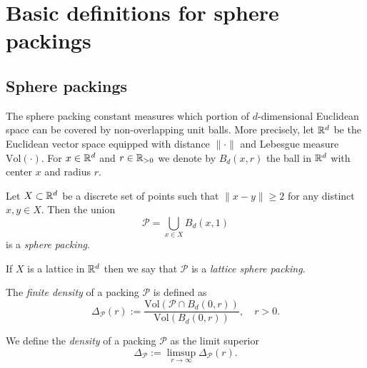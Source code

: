 %

\section{Basic definitions for sphere packings}
\subsection{Sphere packings}
The sphere packing constant measures which portion of $d$-dimensional Euclidean
space can be covered by non-overlapping unit balls. More precisely, let $\mathbb{R}^d$ be the Euclidean vector space equipped with distance $\|\cdot\|$ and Lebesgue measure $\mathrm{Vol}(\cdot)$. For $x\in\mathbb{R}^d$ and $r\in\mathbb{R}_{>0}$ we denote by $B_d(x,r)$ the ball in $\mathbb{R}^d$ with center $x$ and radius $r$.

\begin{definition}Let $X\subset \mathbb{R}^d$ be a discrete set of points such that $\|x-y\|\geq2$ for any distinct $x,y\in X$. Then the union
$$\mathcal{P}=\bigcup_{x\in X} B_d(x,1)$$ is a \emph{sphere packing}.
\end{definition}

\begin{definition}If $X$ is a lattice in $\mathbb{R}^d$ then we say that $\mathcal{P}$ is a \emph{lattice sphere packing}.
\end{definition}

\begin{definition} The \emph{finite density} of a packing $\mathcal{P}$ is defined as
$$\Delta_{\mathcal{P}}(r):=\frac{\mathrm{Vol}(\mathcal{P}\cap B_d(0,r))}{\mathrm{Vol}(B_d(0,r))},\quad r>0.$$
\end{definition}

\begin{definition} We define the \emph{density} of a packing $\mathcal{P}$ as the limit superior
$$\Delta_{\mathcal{P}}:=\limsup\limits_{r\to\infty}\Delta_{\mathcal{P}}(r). $$
\end{definition}

